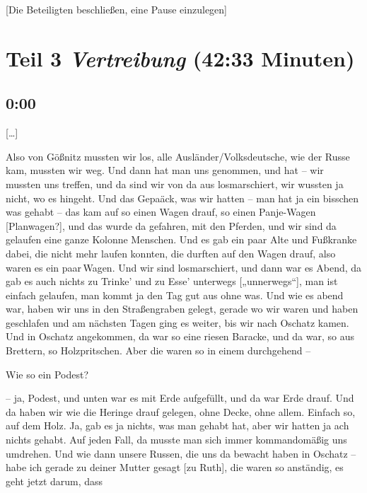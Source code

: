 \documentclass[ngerman,]{article}
\providecommand{\tightlist}{%
  \setlength{\itemsep}{0pt}\setlength{\parskip}{0pt}}
\begin{document}
\begin{multicols}{3}
{[}Die Beteiligten beschließen, eine Pause einzulegen{]}

\hypertarget{vertreibung}{%
\section{\texorpdfstring{Teil 3 \emph{Vertreibung} (42:33
Minuten)}{Teil 3 Vertreibung (42:33 Minuten)}}\label{vertreibung}}

\hypertarget{section-7}{%
\subsection{0:00}\label{section-7}}

{[}\ldots{}{]}

\begin{description}
\tightlist
\item[Käthe]
Also von Gößnitz mussten wir los, alle Ausländer/Volksdeutsche, wie der
Russe kam, mussten wir weg. Und dann hat man uns genommen, und hat – wir
mussten uns treffen, und da sind wir von da aus losmarschiert, wir
wussten ja nicht, wo es hingeht. Und das Gepaäck, was wir hatten – man
hat ja ein bisschen was gehabt – das kam auf so einen Wagen drauf, so
einen Panje-Wagen {[}Planwagen?{]}, und das wurde da gefahren, mit den
Pferden, und wir sind da gelaufen eine ganze Kolonne Menschen. Und es
gab ein paar Alte und Fußkranke dabei, die nicht mehr laufen konnten,
die durften auf den Wagen drauf, also waren es ein paar\,Wagen. Und wir
sind losmarschiert, und dann war es Abend, da gab es auch nichts zu
Trinke' und zu Esse' unterwegs {[}„unnerwegs“{]}, man ist einfach
gelaufen, man kommt ja den Tag gut aus ohne was. Und wie es abend war,
haben wir uns in den Straßengraben gelegt, gerade wo wir waren und haben
geschlafen und am nächsten Tagen ging es weiter, bis wir nach Oschatz
kamen. Und in Oschatz angekommen, da war so eine riesen Baracke, und da
war, so aus Brettern, so Holzpritschen. Aber die waren so in einem
durchgehend –
\item[Ruth]
Wie so ein Podest?
\item[Käthe]
– ja, Podest, und unten war es mit Erde aufgefüllt, und da war Erde
drauf. Und da haben wir wie die Heringe drauf gelegen, ohne Decke, ohne
allem. Einfach so, auf dem Holz. Ja, gab es ja nichts, was man gehabt
hat, aber wir hatten ja ach nichts gehabt. Auf jeden Fall, da musste man
sich immer kommandomäßig uns umdrehen. Und wie dann unsere Russen, die
uns da bewacht haben in Oschatz – habe ich gerade zu deiner Mutter
gesagt {[}zu Ruth{]}, die waren so anständig, es geht jetzt darum, dass

\end{description}
\end{multicols}
\end{document}
